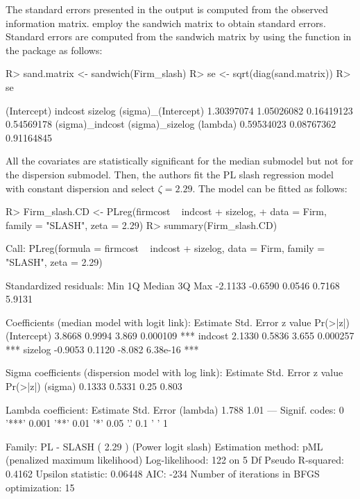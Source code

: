 The standard errors presented in the  output is computed from the observed information matrix. \cite{QueirozFerrari2023} employ the sandwich matrix to obtain standard errors. Standard errors are computed from the sandwich matrix by using the  function in the  package as follows:
\begin{Schunk}
\begin{Sinput}
R> sand.matrix <- sandwich(Firm_slash)
R> se <- sqrt(diag(sand.matrix)) 
R> se
\end{Sinput}
\begin{Soutput}
        (Intercept)             indcost             sizelog (sigma)_(Intercept) 
         1.30397074          1.05026082          0.16419123          0.54569178 
    (sigma)_indcost     (sigma)_sizelog            (lambda) 
         0.59534023          0.08767362          0.91164845 
\end{Soutput}
\end{Schunk}

All the covariates are statistically significant for the median submodel but not for the dispersion submodel. Then, the authors fit the PL slash regression model with constant dispersion and select $\zeta=2.29$. The model can be fitted as follows: 
\begin{Schunk}
\begin{Sinput}
R> Firm_slash.CD <- PLreg(firmcost ~ indcost + sizelog,
+			data = Firm, family = "SLASH", zeta = 2.29)
R> summary(Firm_slash.CD)
\end{Sinput}
\begin{Soutput}
Call:
PLreg(formula = firmcost ~ indcost + sizelog, 
	data = Firm, family = "SLASH", zeta = 2.29)

Standardized residuals:
    Min      1Q  Median      3Q     Max 
-2.1133 -0.6590  0.0546  0.7168  5.9131 

Coefficients (median model with logit link):
            Estimate Std. Error z value Pr(>|z|)    
(Intercept)   3.8668     0.9994   3.869 0.000109 ***
indcost       2.1330     0.5836   3.655 0.000257 ***
sizelog      -0.9053     0.1120  -8.082 6.38e-16 ***

Sigma coefficients (dispersion model with log link):
        Estimate Std. Error z value Pr(>|z|)
(sigma)   0.1333     0.5331    0.25    0.803

Lambda coefficient:
         Estimate Std. Error
(lambda)    1.788       1.01
---
Signif. codes:  0 '***' 0.001 '**' 0.01 '*' 0.05 '.' 0.1 ' ' 1 

Family: PL - SLASH ( 2.29 ) (Power logit slash)
Estimation method: pML (penalized maximum likelihood)
Log-likelihood:   122 on 5 Df
Pseudo R-squared: 0.4162
Upsilon statistic: 0.06448
AIC:  -234
Number of iterations in BFGS optimization: 15
\end{Soutput}
\end{Schunk}

